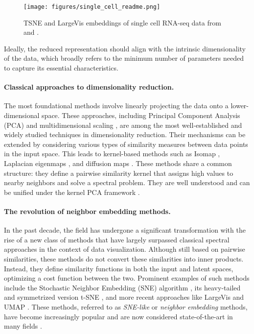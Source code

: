 \citep{chen2020simple}

\begin{figure}[t]
    \centering
    \texttt{[image: figures/single\_cell\_readme.png]}
    \caption{TSNE and LargeVis embeddings of single cell RNA-seq data from \citep{macosko2015highly} and \citep{zheng2017massively}.
    }
    \label{fig:intro_fig}
\end{figure}

Ideally, the reduced representation should align with the intrinsic dimensionality of the data, which broadly refers to the minimum number of parameters needed to capture its essential characteristics.

\paragraph{Classical approaches to dimensionality reduction.}
The most foundational methods involve linearly projecting the data onto a lower-dimensional space. These approaches, including Principal Component Analysis (PCA) \citep{pearson1901liii} and multidimensional scaling \citep{kruskal1978multidimensional}, are among the most well-established and widely studied techniques in dimensionality reduction. Their mechanisms can be extended by considering various types of similarity measures between data points in the input space. This leads to kernel-based methods such as Isomap \citep{balasubramanian2002isomap}, Laplacian eigenmaps \citep{belkin2003laplacian}, and diffusion maps \citep{coifman2006diffusion}. These methods share a common structure: they define a pairwise similarity kernel that assigns high values to nearby neighbors and solve a spectral problem. They are well understood and can be unified under the kernel PCA framework \citep{ham2004kernel}.

\paragraph{The revolution of neighbor embedding methods.}
In the past decade, the field has undergone a significant transformation with the rise of a new class of methods that have largely surpassed classical spectral approaches in the context of data visualization. Although still based on pairwise similarities, these methods do not convert these similarities into inner products. Instead, they define similarity functions in both the input and latent spaces, optimizing a cost function between the two. Prominent examples of such methods include the Stochastic Neighbor Embedding (SNE) algorithm \citep{NIPS2002SNE}, its heavy-tailed and symmetrized version t-SNE \citep{maaten2008tSNE}, and more recent approaches like LargeVis \citep{tang2016visualizing} and UMAP \citep{mcinnes2018umap}. These methods, referred to as \textit{SNE-like} or \textit{neighbor embedding} methods, have become increasingly popular and are now considered state-of-the-art in many fields \citep{li2017application,kobak2019art,anders2018dissecting}.
 
